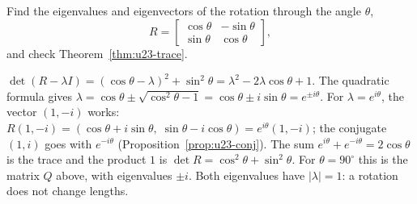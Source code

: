 \begin{exercise}\label{exr:u23-rotation}
Find the eigenvalues and eigenvectors of the rotation through the angle $\theta$,
\[
  R=\begin{bmatrix} \cos\theta & -\sin\theta\\ \sin\theta & \cos\theta\end{bmatrix},
\]
and check Theorem~\ref{thm:u23-trace}.
\end{exercise}
\begin{solution}
$\det(R-\lambda I)=(\cos\theta-\lambda)^{2}+\sin^{2}\theta=\lambda^{2}-2\lambda\cos\theta+1$.
The quadratic formula gives
$\lambda=\cos\theta\pm\sqrt{\cos^{2}\theta-1}=\cos\theta\pm i\sin\theta=e^{\pm i\theta}$.
For $\lambda=e^{i\theta}$, the vector $(1,-i)$ works:
$R(1,-i)=(\cos\theta+i\sin\theta,\;\sin\theta-i\cos\theta)=e^{i\theta}(1,-i)$; the conjugate
$(1,i)$ goes with $e^{-i\theta}$ (Proposition~\ref{prop:u23-conj}). The sum
$e^{i\theta}+e^{-i\theta}=2\cos\theta$ is the trace and the product $1$ is
$\det R=\cos^{2}\theta+\sin^{2}\theta$. For $\theta=90^{\circ}$ this is the matrix $Q$ above,
with eigenvalues $\pm i$. Both eigenvalues have $|\lambda|=1$: a rotation does not change
lengths.
\end{solution}

